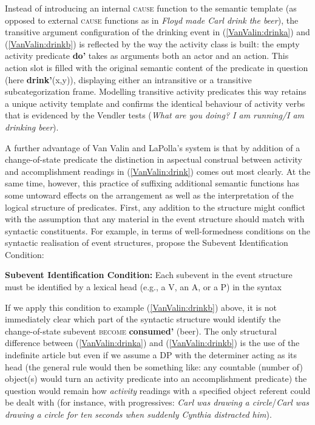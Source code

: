 Instead of introducing an internal \textsc{cause} function to the semantic template (as opposed to external \textsc{cause} functions as in \textit{Floyd made Carl drink the beer}), the transitive argument configuration of the drinking event in (\ref{VanValin:drinka}) and (\ref{VanValin:drinkb}) is reflected by the way the activity class is built: the empty activity predicate \textbf{do'} takes as arguments both an actor and an action. This action slot is filled with the original semantic content of the predicate in question (here \textbf{drink'}(x,y)), displaying either an intransitive or a transitive subcategorization frame. Modelling transitive activity predicates this way retains a unique activity template and confirms the identical behaviour of activity verbs that is evidenced by the Vendler tests (\textit{What are you doing? I am running/I am drinking beer}). 

A further advantage of Van Valin and LaPolla's system is that by addition of a change-of-state predicate the distinction in aspectual construal between activity and accomplishment readings in (\ref{VanValin:drink}) comes out most clearly. At the same time, however, this practice of suffixing additional semantic functions has some untoward effects on the arrangement as well as the interpretation of the logical structure of predicates. First, any addition to the structure might conflict with the assumption that any material in the event structure should match with syntactic constituents. For example, in terms of well-formedness conditions on the syntactic realisation of event structures, \citet[112]{rappaport1998building} propose the Subevent Identification Condition:
 
\ea \textbf{Subevent Identification Condition:} Each subevent in the event structure must be identified by a lexical head (e.g., a V, an A, or a P) in the syntax 
\z

If we apply this condition to example (\ref{VanValin:drinkb}) above, it is not immediately clear which part of the syntactic structure would identify the change-of-state subevent \textsc{become} \textbf{consumed'} (beer). The only structural difference between (\ref{VanValin:drinka}) and (\ref{VanValin:drinkb}) is the use of the indefinite article but even if we assume a DP with the determiner acting as its head (the general rule would then be something like: any countable (number of) object(s) would turn an activity predicate into an accomplishment predicate) the question would remain how \emph{activity} readings with a specified object referent could be dealt with (for instance, with progressives: \textit{Carl was drawing a circle}/\textit{Carl was drawing a circle for ten seconds when suddenly Cynthia distracted him}). 

